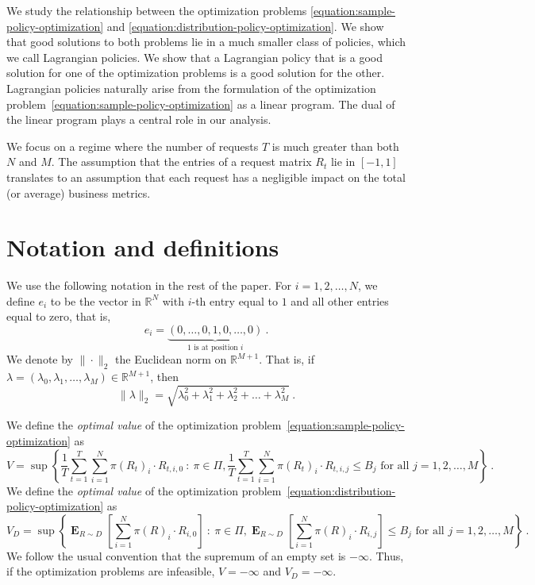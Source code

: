 \documentclass[12pt]{article}
\newcommand{\R}{\mathbb{R}}
\DeclareMathOperator*{\Exp}{\mathbf{E}}
\theoremstyle{definition}
\begin{document}
We study the relationship between the optimization problems
\eqref{equation:sample-policy-optimization} and
\eqref{equation:distribution-policy-optimization}. We show that good solutions
to both problems lie in a much smaller class of policies, which we call
Lagrangian policies. We show that a Lagrangian policy that is a good solution
for one of the optimization problems is a good solution for the other.
Lagrangian policies naturally arise from the formulation of the optimization
problem~\eqref{equation:sample-policy-optimization} as a linear program. The
dual of the linear program plays a central role in our analysis.

We focus on a regime where the number of requests $T$ is much greater than both
$N$ and $M$. The assumption that the entries of a request matrix $R_t$ lie in
$[-1,1]$ translates to an assumption that each request has a negligible impact
on the total (or average) business metrics.

\section{Notation and definitions}

We use the following notation in the rest of the paper. For $i=1,2,\dots,N$, we
define $e_i$ to be the vector in $\R^N$ with $i$-th entry equal to $1$ and all
other entries equal to zero, that is,
$$
e_i = \underbrace{(0,\dots,0,1,0,\dots,0)}_{\text{$1$ is at position $i$}} \: .
$$
We denote by $\|\cdot\|_2$ the Euclidean norm on $\R^{M+1}$. That is, if $\lambda = (\lambda_0, \lambda_1, \dots, \lambda_M) \in \R^{M+1}$, then
$$
\|\lambda\|_2 = \sqrt{\lambda_0^2 + \lambda_1^2 + \lambda_2^2 + \dots + \lambda_M^2} \: .
$$

We define the \emph{optimal value} of the optimization problem~\eqref{equation:sample-policy-optimization} as
$$
V = \sup \left\{ \frac{1}{T} \sum_{t=1}^T \sum_{i=1}^N \pi(R_t)_i \cdot R_{t,i,0} ~:~ \pi \in \Pi, \frac{1}{T} \sum_{t=1}^T \sum_{i=1}^N \pi(R_t)_i \cdot R_{t,i,j} \le B_j \text{ for all $j=1,2,\dots,M$} \right\} \: .
$$
We define the \emph{optimal value} of the optimization problem~\eqref{equation:distribution-policy-optimization} as
$$
V_D = \sup \left\{ \Exp_{R \sim D} \left[ \sum_{i=1}^N \pi(R)_i \cdot R_{i,0} \right] ~:~ \pi \in \Pi, \Exp_{R \sim D} \left[ \sum_{i=1}^N \pi(R)_i \cdot R_{i,j} \right] \le B_j \text{ for all $j=1,2,\dots,M$} \right\} \: .
$$
We follow the usual convention that the supremum of an empty set is $-\infty$. Thus,
if the optimization problems are infeasible, $V = -\infty$ and $V_D = -\infty$.
\end{document}
